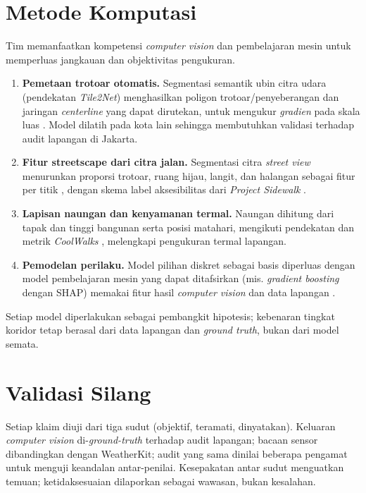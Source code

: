 \documentclass[11pt,a4paper]{report}
\begin{document}
\section{Metode Komputasi}
Tim memanfaatkan kompetensi \emph{computer vision} dan pembelajaran mesin untuk memperluas
jangkauan dan objektivitas pengukuran.
\begin{enumerate}
  \item \textbf{Pemetaan trotoar otomatis.} Segmentasi semantik ubin citra udara (pendekatan
    \emph{Tile2Net}) menghasilkan poligon trotoar/penyeberangan dan jaringan \emph{centerline}
    yang dapat dirutekan, untuk mengukur \emph{gradien} pada skala luas \autocite{tile2net2023}.
    Model dilatih pada kota lain sehingga membutuhkan validasi terhadap audit lapangan di Jakarta.
  \item \textbf{Fitur streetscape dari citra jalan.} Segmentasi citra \emph{street view}
    menurunkan proporsi trotoar, ruang hijau, langit, dan halangan sebagai fitur per titik
    \autocite{walkabilitydl2024}, dengan skema label aksesibilitas dari \emph{Project Sidewalk}
    \autocite{projectsidewalk2019}.
  \item \textbf{Lapisan naungan dan kenyamanan termal.} Naungan dihitung dari tapak dan tinggi
    bangunan serta posisi matahari, mengikuti pendekatan dan metrik \emph{CoolWalks}
    \autocite{coolwalks2025}, melengkapi pengukuran termal lapangan.
  \item \textbf{Pemodelan perilaku.} Model pilihan diskret sebagai basis \autocite{afkara2020walking}
    diperluas dengan model pembelajaran mesin yang dapat ditafsirkan (mis. \emph{gradient boosting}
    dengan SHAP) memakai fitur hasil \emph{computer vision} dan data lapangan
    \autocite{routechoiceml2024}.
\end{enumerate}
Setiap model diperlakukan sebagai pembangkit hipotesis; kebenaran tingkat koridor tetap berasal
dari data lapangan dan \emph{ground truth}, bukan dari model semata.

\section{Validasi Silang}
Setiap klaim diuji dari tiga sudut (objektif, teramati, dinyatakan). Keluaran \emph{computer
vision} di-\emph{ground-truth} terhadap audit lapangan; bacaan sensor dibandingkan dengan
WeatherKit; audit yang sama dinilai beberapa pengamat untuk menguji keandalan antar-penilai.
Kesepakatan antar sudut menguatkan temuan; ketidaksesuaian dilaporkan sebagai wawasan, bukan
kesalahan.
\end{document}
